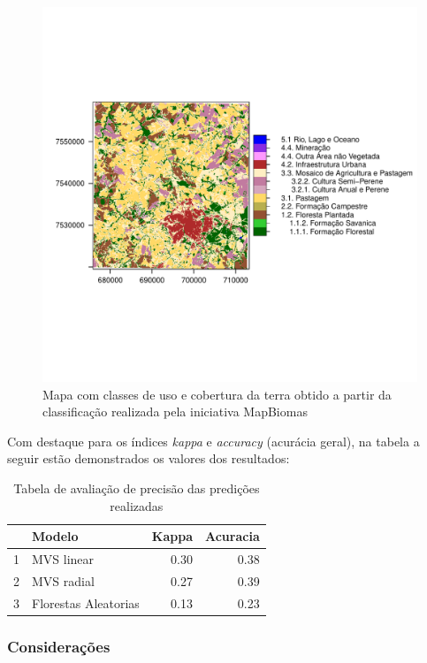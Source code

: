 \begin{figure}[H]
    \centering
    \caption{Mapa com classes de uso e cobertura da terra obtido a partir da classificação realizada pela iniciativa MapBiomas} 
    \includegraphics[scale=0.8]{figs/map_mapbiomas.pdf}
\end{figure}

Com destaque para os índices \emph{kappa} e \emph{accuracy} (acurácia geral), na tabela a seguir estão demonstrados os valores dos resultados:

\begin{table}[H]
\caption{Tabela de avaliação de precisão das predições realizadas}
\centering
\begin{tabular}{rlrr}
  \hline
 & Modelo & Kappa & Acuracia \\ 
  \hline
1 & MVS linear & 0.30 & 0.38 \\ 
  2 & MVS radial & 0.27 & 0.39 \\ 
  3 & Florestas Aleatorias & 0.13 & 0.23 \\ 
   \hline
\end{tabular}
\end{table}

\subsubsection{Considerações}\label{considerauxe7uxf5es}

